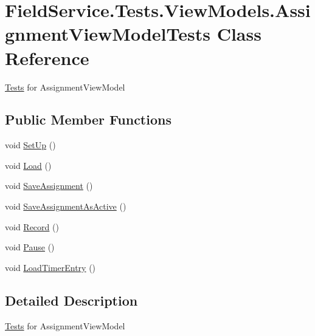 \hypertarget{class_field_service_1_1_tests_1_1_view_models_1_1_assignment_view_model_tests}{\section{Field\+Service.\+Tests.\+View\+Models.\+Assignment\+View\+Model\+Tests Class Reference}
\label{class_field_service_1_1_tests_1_1_view_models_1_1_assignment_view_model_tests}
}


\hyperlink{namespace_field_service_1_1_tests}{Tests} for Assignment\+View\+Model  


\subsection*{Public Member Functions}
\begin{DoxyCompactItemize}
\item 
void \hyperlink{class_field_service_1_1_tests_1_1_view_models_1_1_assignment_view_model_tests_a97f1eb5c25f63cf6b14d6e6e8a3a4e6a}{Set\+Up} ()
\item 
void \hyperlink{class_field_service_1_1_tests_1_1_view_models_1_1_assignment_view_model_tests_aaff355b01ff615fc3f96328f75ca1cb4}{Load} ()
\item 
void \hyperlink{class_field_service_1_1_tests_1_1_view_models_1_1_assignment_view_model_tests_a502718b1f28799819586a7c66fb320e1}{Save\+Assignment} ()
\item 
void \hyperlink{class_field_service_1_1_tests_1_1_view_models_1_1_assignment_view_model_tests_af9ff9afe650c30e509c648aadb2270cf}{Save\+Assignment\+As\+Active} ()
\item 
void \hyperlink{class_field_service_1_1_tests_1_1_view_models_1_1_assignment_view_model_tests_a7b3a9cc9fcc68ac7ea444264ede6f519}{Record} ()
\item 
void \hyperlink{class_field_service_1_1_tests_1_1_view_models_1_1_assignment_view_model_tests_a3b8c9ab3b10f1aa5a46b441f40c39085}{Pause} ()
\item 
void \hyperlink{class_field_service_1_1_tests_1_1_view_models_1_1_assignment_view_model_tests_a3e192657f8ad1817522acee981bec849}{Load\+Timer\+Entry} ()
\end{DoxyCompactItemize}


\subsection{Detailed Description}
\hyperlink{namespace_field_service_1_1_tests}{Tests} for Assignment\+View\+Model 



